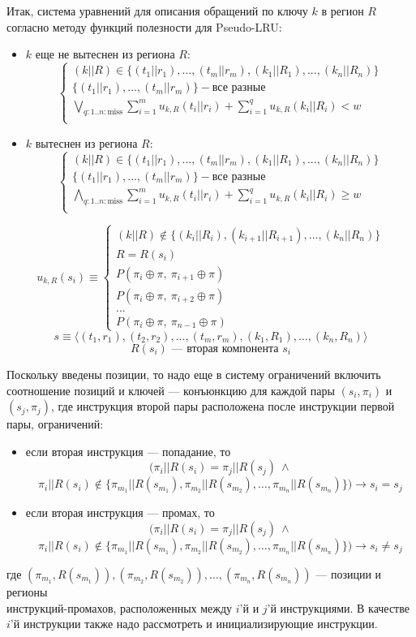 \documentclass[14pt]{extreport}
\newcommand{\PseudoLRU}{\textsf{Pseudo-LRU}\xspace}
\begin{document}
Итак, система уравнений для описания обращений по ключу $k$ в регион $R$ согласно методу функций полезности для \PseudoLRU:
\begin{itemize}
\item $k$ еще не вытеснен из региона $R$:
$$
\left\{\begin{array}{l}
(k||R) \in \{(t_1||r_1), ..., (t_m||r_m), (k_1||R_1), ..., (k_n||R_n)\}\\
\{(t_1||r_1), ..., (t_m||r_m)\} - \mbox{все разные}\\
\bigvee_{q:1..n:\mbox{miss}} \sum\limits_{i=1}^m u_{k,R}(t_i||r_i) + \sum\limits_{i=1}^q u_{k,R}(k_i||R_i) < w\\
\end{array} \right.
$$
\item $k$ вытеснен из региона $R$:
$$
\left\{\begin{array}{l} (k||R) \in \{(t_1||r_1), ..., (t_m||r_m), (k_1||R_1), ..., (k_n||R_n)\}\\
\{(t_1||r_1), ..., (t_m||r_m)\} - \mbox{все разные}\\
\bigwedge_{q:1..n:\mbox{miss}} \sum\limits_{i=1}^m u_{k,R}(t_i||r_i) + \sum\limits_{i=1}^q u_{k,R}(k_i||R_i) \geqslant w\\
\end{array} \right.
$$
\end{itemize}

$$u_{k,R} (s_i) \equiv \left\{\begin{array}{l}
(k||R) \notin \{(k_i||R_i), (k_{i+1}||R_{i+1}), ..., (k_n||R_n)\}\\
R = R(s_i)\\
P(\pi_i \oplus \pi,~\pi_{i+1} \oplus \pi)\\
P(\pi_i \oplus \pi,~\pi_{i+2} \oplus \pi)\\
... \\
P(\pi_i \oplus \pi,~\pi_{n-1} \oplus \pi)
\end{array}\right.
$$
$$s \equiv \langle (t_1,r_1), (t_2,r_2), ..., (t_m,r_m), (k_1, R_1), ..., (k_n,R_n) \rangle$$
$$R(s_i) \mbox{~--- вторая компонента~} s_i$$

Поскольку введены позиции, то надо еще в систему ограничений включить соотношение позиций и ключей --- конъюнкцию для каждой пары $(s_i,\pi_i)$ и $(s_j, \pi_j)$, где инструкция второй пары расположена после инструкции первой пары, ограничений:
\begin{itemize}
    \item если вторая инструкция --- попадание, то $$(\pi_i||R(s_i) = \pi_j||R(s_j)~\wedge$$ $$\pi_i||R(s_i) \notin \{\pi_{m_1}||R(s_{m_1}), \pi_{m_2}||R(s_{m_2}), \dots, \pi_{m_n}||R(s_{m_n})\}) \rightarrow s_i = s_j$$
    \item если вторая инструкция --- промах, то $$(\pi_i||R(s_i) = \pi_j||R(s_j)~\wedge$$ $$\pi_i||R(s_i) \notin \{\pi_{m_1}||R(s_{m_1}), \pi_{m_2}||R(s_{m_2}), \dots, \pi_{m_n}||R(s_{m_n})\}) \rightarrow s_i \neq s_j$$
\end{itemize}
где $(\pi_{m_1},R(s_{m_1})), (\pi_{m_2},R(s_{m_2})), \dots, (\pi_{m_n},R(s_{m_n}))$ --- позиции и регионы\\инструкций-промахов, расположенных между $i$'й и $j$'й инструкциями. В качестве $i$'й инструкции также надо рассмотреть и инициализирующие инструкции.
\end{document}

